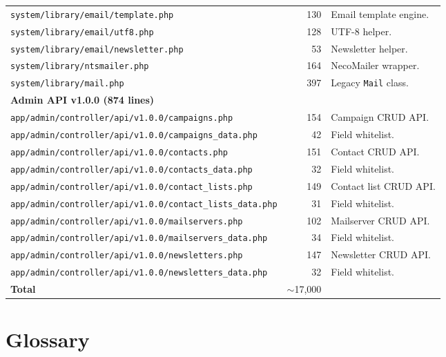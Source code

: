 \documentclass[11pt,a4paper]{article}
\begin{document}
\begin{table}[htbp]
\begin{tabularx}{\columnwidth}{lrX}
\texttt{system/library/email/template.php}               & 130  & Email template engine. \\
\texttt{system/library/email/utf8.php}                   & 128  & UTF-8 helper. \\
\texttt{system/library/email/newsletter.php}             & 53   & Newsletter helper. \\
\texttt{system/library/ntsmailer.php}                    & 164  & NecoMailer wrapper. \\
\texttt{system/library/mail.php}                         & 397  & Legacy \texttt{Mail} class. \\
\midrule
\multicolumn{3}{l}{\textbf{Admin API v1.0.0 (874 lines)}} \\
\texttt{app/admin/controller/api/v1.0.0/campaigns.php}       & 154 & Campaign CRUD API. \\
\texttt{app/admin/controller/api/v1.0.0/campaigns\_data.php} & 42  & Field whitelist. \\
\texttt{app/admin/controller/api/v1.0.0/contacts.php}        & 151 & Contact CRUD API. \\
\texttt{app/admin/controller/api/v1.0.0/contacts\_data.php}  & 32  & Field whitelist. \\
\texttt{app/admin/controller/api/v1.0.0/contact\_lists.php}  & 149 & Contact list CRUD API. \\
\texttt{app/admin/controller/api/v1.0.0/contact\_lists\_data.php} & 31 & Field whitelist. \\
\texttt{app/admin/controller/api/v1.0.0/mailservers.php}     & 102 & Mailserver CRUD API. \\
\texttt{app/admin/controller/api/v1.0.0/mailservers\_data.php} & 34 & Field whitelist. \\
\texttt{app/admin/controller/api/v1.0.0/newsletters.php}     & 147 & Newsletter CRUD API. \\
\texttt{app/admin/controller/api/v1.0.0/newsletters\_data.php} & 32 & Field whitelist. \\
\midrule
\textbf{Total}                                           & $\sim$17{,}000 & \\
\bottomrule
\end{tabularx}
\end{table}

\section{Glossary}\label{app:glossary}
\end{document}
